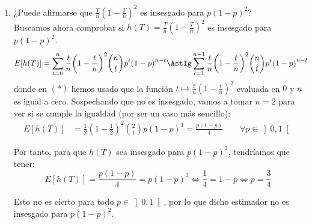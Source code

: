 \begin{ejercicio}
\begin{enumerate}
            de donde:
            \begin{equation*}
                1 = \sum_{t=0}^{n}h(t)\binom{n}{t}p^{t-k} {(1-p)}^{n-t} \qquad \forall p \in \left]0,1\right[
            \end{equation*}
            en particular, tomando $p\to 0$, como $t-k < 0$ para todo $t \in \{0,\ldots,k\}$, tenemos que:
            \begin{equation*}
                1 = \lim_{p\to0} \sum_{t=0}^{n}h(t)\binom{n}{t}p^{t-k} {(1-p)}^{n-t} = \infty
            \end{equation*}
            \underline{contradicción}, con lo que para $k>n$ no puede existir un estimador insesgado para $p^k$. También podríamos haber justificado que son dos polinomios de distinto grado, para llegar a contradicción.
        
        \item ¿Puede afirmarse que $\frac{T}{n}{\left(1-\frac{T}{n}\right)}^{2}$ es insesgado para $p{(1-p)}^{2}$?\\
        
        Buscamos ahora comprobar si $h(T) = \frac{T}{n}{\left(1-\frac{T}{n}\right)}^{2}$ es insesgado para $p{(1-p)}^{2}$. 
        \begin{align*}
            E[h(T)] &= \sum_{t=0}^{n}\frac{t}{n}{\left(1-\frac{t}{n}\right)}^{2}\binom{n}{t}p^t{(1-p)}^{n-t} \AstIg \sum_{t=1}^{n-1}\frac{t}{n}{\left(1-\frac{t}{n}\right)}^{2}\binom{n}{t}p^t{(1-p)}^{n-t}
        \end{align*}
        donde en $(\ast)$ hemos usado que la función $t\mapsto \frac{t}{n}{\left(1-\frac{t}{n}\right)}^{2}$ evaluada en $0$ y $n$ es igual a cero. Sospechando que no es insesgado, vamos a tomar $n=2$ para ver si se cumple la igualdad (por ser un caso más sencillo):
        \begin{align*}
            E[h(T)] &=  \frac{1}{2}{\left(1-\frac{1}{2}\right)}^{2}\binom{2}{1}p{(1-p)}^{1} = \frac{p(1-p)}{4}\qquad \forall p\in \left]0,1\right[
        \end{align*}

        Por tanto, para que $h(T)$ sea insesgado para $p{(1-p)}^{2}$, tendríamos que tener:
        \begin{equation*}
            E[h(T)] = \frac{p(1-p)}{4} = p{(1-p)}^{2} \Longleftrightarrow \frac{1}{4} = 1-p\iff p = \frac{3}{4}
        \end{equation*}

        Esto no es cierto para todo $p\in \left]0,1\right[$, por lo que dicho estimador no es insesgado para $p{(1-p)}^{2}$.
    \end{enumerate}
\end{ejercicio}

